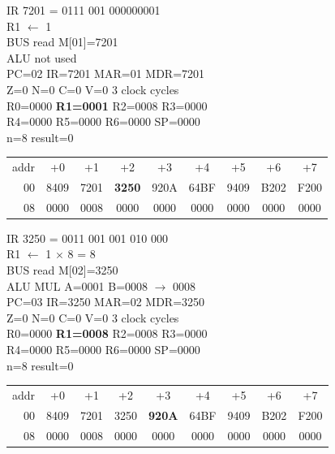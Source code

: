 \noindent\begin{tcolorbox}[stepbox, title={Step 2 \hfill PC 01 \quad LI R1, 1}]
\textcolor{dim}{IR} 7201 = 0111 001 000000001\\
R1 $\leftarrow$ 1\\
\textcolor{dim}{BUS} read M[01]=7201\\
\textcolor{dim}{ALU} \textcolor{dim}{not used}\\
PC=02 IR=7201 MAR=01 MDR=7201\\
Z=0 N=0 C=0 V=0 \hfill \textcolor{dim}{3 clock cycles}\\
R0=0000 \textcolor{wrt}{\textbf{R1=0001}} R2=0008 R3=0000\\
R4=0000 R5=0000 R6=0000 SP=0000\\
\textcolor{dim}{n=8  result=0}\\[1pt]
{\setlength{\tabcolsep}{1.6pt}\begin{tabular}{@{}r*{8}{c}@{}}
\textcolor{dim}{addr} & \textcolor{dim}{+0} & \textcolor{dim}{+1} & \textcolor{dim}{+2} & \textcolor{dim}{+3} & \textcolor{dim}{+4} & \textcolor{dim}{+5} & \textcolor{dim}{+6} & \textcolor{dim}{+7}\\
\textcolor{dim}{00} & 8409 & 7201 & \cellcolor{pcc}\textbf{3250} & 920A & 64BF & 9409 & B202 & F200\\
\textcolor{dim}{08} & 0000 & \cellcolor{datac}0008 & \cellcolor{datac}0000 & 0000 & 0000 & 0000 & 0000 & 0000\\
\end{tabular}}
\end{tcolorbox}\hfill\begin{tcolorbox}[stepbox, title={Step 3 \hfill PC 02 \quad MUL R1, R1, R2}]
\textcolor{dim}{IR} 3250 = 0011 001 001 010 000\\
R1 $\leftarrow$ 1 $\times$ 8 = 8\\
\textcolor{dim}{BUS} read M[02]=3250\\
\textcolor{dim}{ALU} MUL A=0001 B=0008 $\rightarrow$ 0008\\
PC=03 IR=3250 MAR=02 MDR=3250\\
Z=0 N=0 C=0 V=0 \hfill \textcolor{dim}{3 clock cycles}\\
R0=0000 \textcolor{wrt}{\textbf{R1=0008}} R2=0008 R3=0000\\
R4=0000 R5=0000 R6=0000 SP=0000\\
\textcolor{dim}{n=8  result=0}\\[1pt]
{\setlength{\tabcolsep}{1.6pt}\begin{tabular}{@{}r*{8}{c}@{}}
\textcolor{dim}{addr} & \textcolor{dim}{+0} & \textcolor{dim}{+1} & \textcolor{dim}{+2} & \textcolor{dim}{+3} & \textcolor{dim}{+4} & \textcolor{dim}{+5} & \textcolor{dim}{+6} & \textcolor{dim}{+7}\\
\textcolor{dim}{00} & 8409 & 7201 & 3250 & \cellcolor{pcc}\textbf{920A} & 64BF & 9409 & B202 & F200\\
\textcolor{dim}{08} & 0000 & \cellcolor{datac}0008 & \cellcolor{datac}0000 & 0000 & 0000 & 0000 & 0000 & 0000\\
\end{tabular}}
\end{tcolorbox}\par\vspace{3pt}
